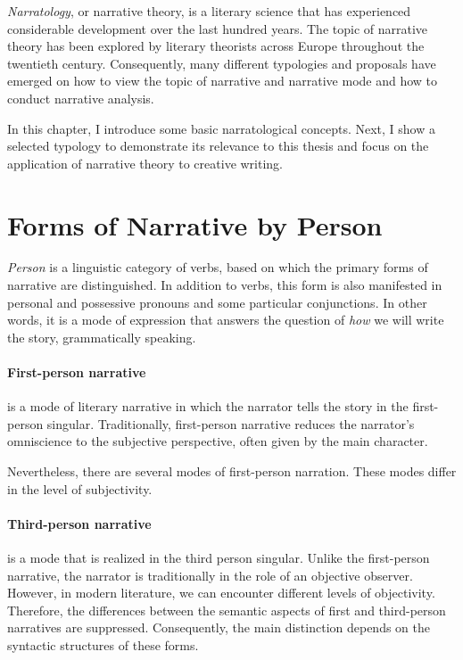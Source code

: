 \emph{Narratology}, or narrative theory, is a literary science that has experienced considerable development over the last hundred years. The topic of narrative theory has been explored by literary theorists across Europe throughout the twentieth century. Consequently, many different typologies and proposals have emerged on how to view the topic of narrative and narrative mode and how to conduct narrative analysis. \cite{kubicek-vypravec}

In this chapter, I introduce some basic narratological concepts. Next, I show a selected typology to demonstrate its relevance to this thesis and focus on the application of narrative theory to creative writing.

\section{Forms of Narrative by Person}
\label{forms-of-narrative}

\emph{Person} is a linguistic category of verbs, based on which the primary forms of narrative are distinguished. In addition to verbs, this form is also manifested in personal and possessive pronouns and some particular conjunctions. In other words, it is a mode of expression that answers the question of \emph{how} we will write the story, grammatically speaking.\cite{docekalova}

\paragraph{First-person narrative} is a mode of literary narrative in which the narrator tells the story in the first-person singular. Traditionally, first-person narrative reduces the narrator's omniscience to the subjective perspective, often given by the main character. \cite{vlasin-slovnik}

Nevertheless, there are several modes of first-person narration. These modes differ in the level of subjectivity. \cite{dolezel-narativni-zpusoby}

\paragraph{Third-person narrative} is a mode that is realized in the third person singular. Unlike the first-person narrative, the narrator is traditionally in the role of an objective observer. However, in modern literature, we can encounter different levels of objectivity. Therefore, the differences between the semantic aspects of first and third-person narratives are suppressed. Consequently, the main distinction depends on the syntactic structures of these forms. \cite{vlasin-slovnik}

